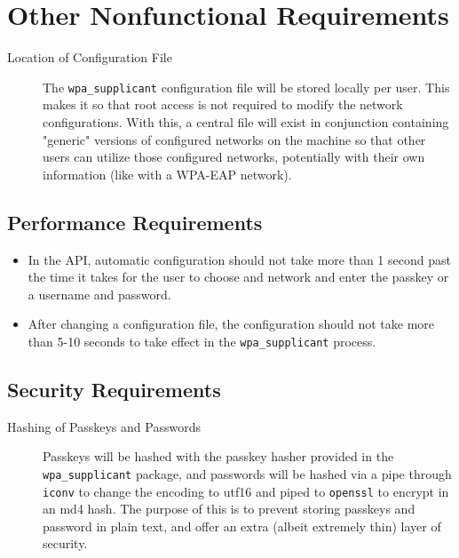 \section{Other Nonfunctional Requirements}
\begin{description}
  \item[Location of Configuration File] The \texttt{wpa\_supplicant} configuration file
    will be stored locally per user. This makes it so that root access is not
    required to modify the network configurations. With this, a central file
    will exist in conjunction containing "generic" versions of configured
    networks on the machine so that other users can utilize those configured
    networks, potentially with their own information (like with a WPA-EAP network).
\end{description}

\subsection{Performance Requirements}
\begin{itemize}
  \item In the API, automatic configuration should not take more than 1 second
    past the time it takes for the user to choose and network and enter the
    passkey or a username and password.
  \item After changing a configuration file, the configuration should not take
    more than 5-10 seconds to take effect in the \texttt{wpa\_supplicant} process.
\end{itemize}

\subsection{Security Requirements}
\begin{description}
  \item[Hashing of Passkeys and Passwords] Passkeys will be hashed with the
    passkey hasher provided in the \texttt{wpa\_supplicant} package, and passwords will
    be hashed via a pipe through \texttt{iconv} to change the encoding to utf16 and piped
    to \texttt{openssl} to encrypt in an md4 hash. The purpose of this is to prevent storing
    passkeys and password in plain text, and offer an extra (albeit extremely thin)
    layer of security.
\end{description}

